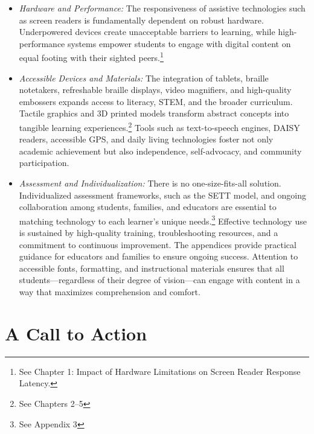 \begin{itemize}
	\item \emph{Hardware and Performance:} The responsiveness of assistive technologies such as screen readers is fundamentally dependent on robust hardware. Underpowered devices create unacceptable barriers to learning, while high-performance systems empower students to engage with digital content on equal footing with their sighted peers.\footnote{See Chapter 1: Impact of Hardware Limitations on Screen Reader Response Latency.}
	\item \emph{Accessible Devices and Materials:} The integration of tablets, braille notetakers, refreshable braille displays, video magnifiers, and high-quality embossers expands access to literacy, STEM, and the broader curriculum. Tactile graphics and 3D printed models transform abstract concepts into tangible learning experiences.\footnote{See Chapters 2–5}
	      Tools such as text-to-speech engines, DAISY readers, accessible GPS, and daily living technologies foster not only academic achievement but also independence, self-advocacy, and community participation. \cite{Chapters6to8}
	\item \emph{Assessment and Individualization:} There is no one-size-fits-all solution. Individualized assessment frameworks, such as the SETT model, and ongoing collaboration among students, families, and educators are essential to matching technology to each learner's unique needs.\footnote{See Appendix 3}
	      Effective technology use is sustained by high-quality training, troubleshooting resources, and a commitment to continuous improvement. The appendices provide practical guidance for educators and families to ensure ongoing success. \cite{Appendices1to4}
	      Attention to accessible fonts, formatting, and instructional materials ensures that all students—regardless of their degree of vision—can engage with content in a way that maximizes comprehension and comfort. \cite{Appendix5}
\end{itemize}

\section{A Call to Action}
\label{sec:conclusion-call-to-action}

